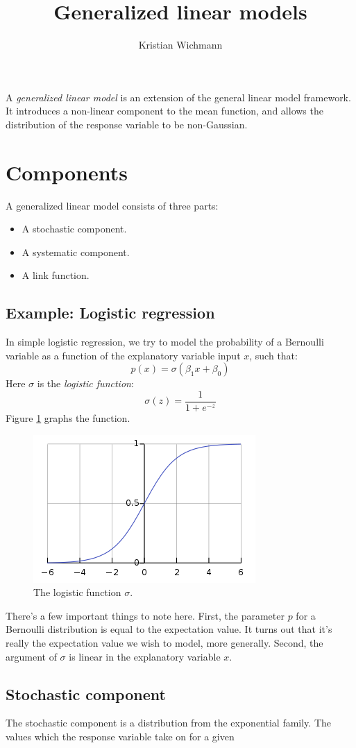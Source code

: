 \documentclass[12pt, a4paper]{article}
\title{Generalized linear models}
\author{Kristian Wichmann}
\numberwithin{equation}{section}
\begin{document}
\maketitle

A \textit{generalized linear model} is an extension of the general linear model framework. It introduces a non-linear component to the mean function, and allows the distribution of the response variable to be non-Gaussian.

\section{Components}
A generalized linear model consists of three parts:
\begin{itemize}
\item A stochastic component.
\item A systematic component.
\item A link function.
\end{itemize}

\subsection{Example: Logistic regression}
In simple logistic regression, we try to model the probability of a Bernoulli variable as a function of the explanatory variable input $x$, such that:
\begin{equation}
p(x)=\sigma(\beta_1 x+\beta_0)
\end{equation}
Here $\sigma$ is the \textit{logistic function}:
\begin{equation}
\sigma(z)=\frac{1}{1+e^{-z}}
\end{equation}
Figure \ref{fig:logistic_function} graphs the function.

\begin{figure}
\centering
\includegraphics{logistic_function}
\caption{The logistic function $\sigma$.}
\label{fig:logistic_function}
\end{figure}

There's a few important things to note here. First, the parameter $p$ for a Bernoulli distribution is equal to the expectation value. It turns out that it's really the expectation value we wish to model, more generally. Second, the argument of $\sigma$ is linear in the explanatory variable $x$.

\subsection{Stochastic component}
The stochastic component is a distribution from the exponential family. The values which the response variable take on for a given 
\end{document}

